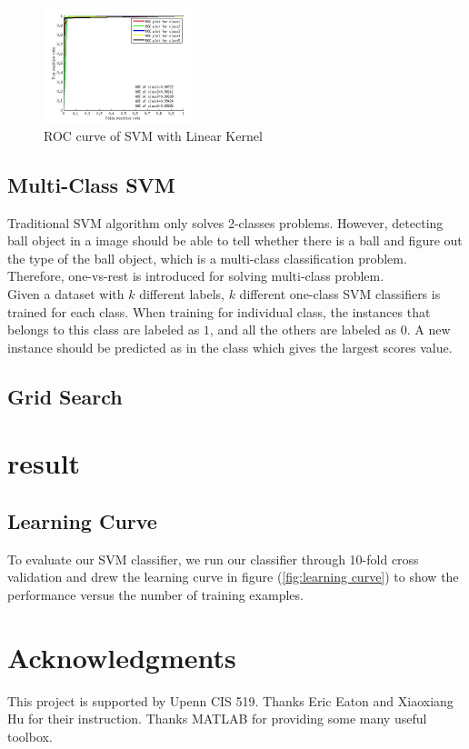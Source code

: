 \documentclass{article}
\begin{document}
\begin{figure}[htb]
\centering
\includegraphics[width = 0.4\textwidth]{ROClinear.jpg}
\caption{ROC curve of SVM with Linear Kernel}
\label{fig:ROC2}
\end{figure}
\subsection{Multi-Class SVM}
Traditional SVM algorithm only solves 2-classes problems. However, detecting ball object in a image should be able to tell whether there is a ball and figure out the type of the ball object, which is a multi-class classification problem. Therefore, one-vs-rest is introduced for solving multi-class problem.\\
Given a dataset with $k$ different labels, $k$ different one-class SVM classifiers is trained for each class. When training for individual class, the instances that belongs to this class are labeled as $1$, and all the others are labeled as $0$. A new instance should be predicted as in the class which gives the largest scores value.\\
\subsection{Grid Search}

\section{result}
\subsection{Learning Curve}
To evaluate our SVM classifier, we run our classifier through 10-fold cross validation and drew the learning curve in figure (\ref{fig:learning curve}) to show the performance versus the number of training examples. 


\section*{Acknowledgments}
This project is supported by Upenn CIS 519. Thanks Eric Eaton and Xiaoxiang Hu for their instruction. Thanks MATLAB for providing some many useful toolbox.



\end{document}
